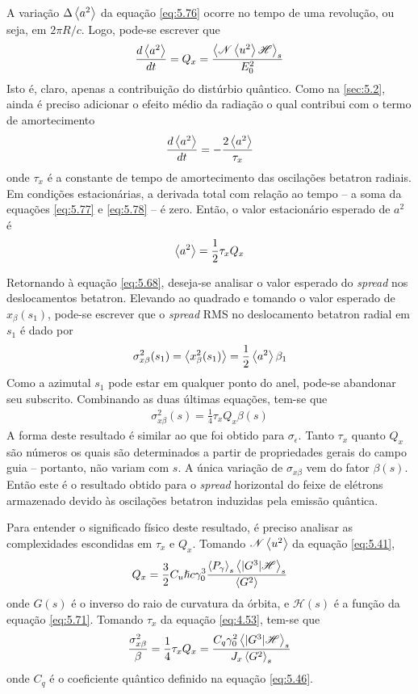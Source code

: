A variação $\Delta \left< a^2 \right>$ da equação \eqref{eq:5.76} ocorre no tempo de uma revolução, ou seja, em $2 \pi R/c$. Logo, pode-se escrever que
\begin{align}
	\frac{d\left< a^2 \right>}{dt} = Q_x = \frac{\left< \mathscr{N}\left< u^2 \right>\mathscr{H} \right>_s}{E_0^2}\label{eq:5.77}
\end{align}
Isto é, claro, apenas a contribuição do distúrbio quântico. Como na \autoref{sec:5.2}, ainda é preciso adicionar o efeito médio da radiação o qual contribui com o termo de amortecimento
\begin{align}
	\frac{d\left< a^2 \right>}{dt} = - \frac{2\left< a^2 \right>}{\tau_x}\label{eq:5.78}
\end{align}
onde $\tau_x$ é a constante de tempo de amortecimento das oscilações betatron radiais. Em condições estacionárias, a derivada total com relação ao tempo -- a soma da equações \eqref{eq:5.77} e \eqref{eq:5.78} -- é zero. Então, o valor estacionário esperado de $a^2$ é
\begin{align}
	\left< a^2 \right> = \frac{1}{2}\tau_x Q_x
\end{align}

Retornando à equação \eqref{eq:5.68}, deseja-se analisar o valor esperado do \textit{spread} nos deslocamentos betatron. Elevando ao quadrado e tomando o valor esperado de $x_\beta(s_1)$, pode-se escrever que o \textit{spread} RMS no deslocamento betatron radial em $s_1$ é dado por
\begin{align}
	\sigma_{x\beta}^2(s_1) = \left< x_\beta^2(s_1) \right> = \frac{1}{2} \left< a^2 \right>\beta_1
\end{align}
Como a azimutal $s_1$ pode estar em qualquer ponto do anel, pode-se abandonar seu subscrito. Combinando as duas últimas equações, tem-se que
\begin{align}
	\sigma_{x\beta}^2(s) = \frac{1}{4}\tau_x Q_x \beta(s)\label{eq:5.81}
\end{align}
A forma deste resultado é similar ao que foi obtido para $\sigma_\epsilon$. Tanto $\tau_x$ quanto $Q_x$ são números os quais são determinados a partir de propriedades gerais do campo guia -- portanto, não variam com $s$. A única variação de $\sigma_{x\beta}$ vem do fator $\beta(s)$. Então este é o resultado obtido para o \textit{spread} horizontal do feixe de elétrons armazenado devido às oscilações betatron induzidas pela emissão quântica.

Para entender o significado físico deste resultado, é preciso analisar as complexidades escondidas em $\tau_x$ e $Q_x$. Tomando $\mathscr{N}\left< u^2 \right>$ da equação \eqref{eq:5.41},
\begin{align}
	Q_x = \frac{3}{2} C_u \hslash c \gamma_0^3 \frac{\left< P_\gamma \right>_s \left< |G^3| \mathscr{H} \right>_s}{\left< G^2 \right>}
\end{align}
onde $G(s)$ é o inverso do raio de curvatura da órbita, e $\mathscr{H}(s)$ é a função da equação \eqref{eq:5.71}. Tomando $\tau_x$ da equação \eqref{eq:4.53}, tem-se que
\begin{align}
	\frac{\sigma_{x\beta}^2}{\beta} = \frac{1}{4}\tau_x Q_x = \frac{C_q \gamma_0^2\left< |G^3| \mathscr{H} \right>_s}{J_x \left< G^2 \right>_s}
\end{align}
onde $C_q$ é o coeficiente quântico definido na equação \eqref{eq:5.46}.

